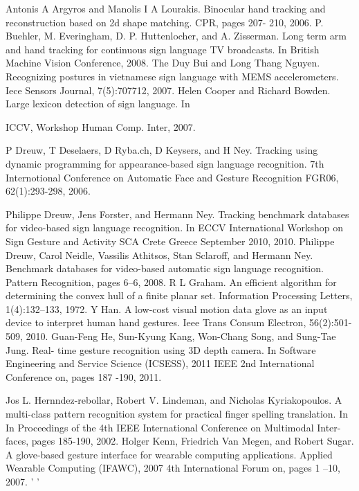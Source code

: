 \documentclass{report}           %
\begin{document}
\begin{thebibliography}{80}

 Antonis  A Argyros  and  Manolis I A Lourakis.   Binocular  hand  tracking  and reconstruction  based on 2d shape matching. CPR, pages 207- 210, 2006.
 P.  Buehler,  M. Everingham,  D. P. Huttenlocher,  and A. Zisserman.  Long term arm and hand  tracking  for continuous sign language TV broadcasts.   In British Machine  Vision Conference, 2008.
   The  Duy Bui and Long Thang Nguyen. Recognizing postures in vietnamese sign language with MEMS accelerometers.  Iece Sensors Journal, 7(5):707712, 2007.
  Helen Cooper and Richard Bowden. Large lexicon detection  of sign language.  In

ICCV,  Workshop Human  Comp. Inter, 2007.

   P Dreuw,  T Deselaers, D Ryba.ch, D Keysers,  and H Ney. Tracking using dynamic programming  for appearance-based  sign language recognition.  7th Internotional Conference on Automatic  Face and Gesture Recognition FGR06, 62(1):293-298,
2006.

   Philippe Dreuw, Jens Forster, and Hermann Ney.  Tracking benchmark databases for video-based sign language recognition.  In ECCV  International  Workshop on Sign Gesture and Activity  SCA  Crete Greece September 2010, 2010.
  Philippe  Dreuw,   Carol  Neidle,   Vassilis Athitsos,    Stan  Sclaroff, and  Hermann Ney. Benchmark databases  for video-based automatic  sign language recognition. Pattern  Recognition, pages 6--6, 2008.
  R L Graham.   An efficient algorithm  for determining  the convex hull of a finite planar  set.  Information  Processing Letters, 1(4):132--133, 1972. 
  Y  Han.    A  low-cost  visual   motion   data   glove  as  an  input   device  to  interpret human   hand  gestures.   Ieee Trans Consum Electron, 56(2):501-509, 2010.
  Guan-Feng He, Sun-Kyung Kang, Won-Chang Song, and Sung-Tae Jung.  Real- time gesture recognition using 3D depth  camera.  In Software Engineering and Service Science  (ICSESS),  2011 IEEE  2nd International  Conference on, pages
187 -190, 2011.

  Jos L. Hernndez-rebollar,  Robert V. Lindeman, and Nicholas Kyriakopoulos. A multi-class pattern  recognition system for practical finger spelling translation.  In In Proceedings of the 4th IEEE  International  Conference on Multimodal Inter- faces, pages 185-190, 2002.
  Holger Kenn,  Friedrich Van Megen, and  Robert  Sugar.  A glove-based gesture interface  for wearable  computing  applications.    Applied  Wearable Computing
(IFAWC),  2007 4th International  Forum on, pages 1  --10,   2007.
'                   '


\end{thebibliography}
\end{document}
